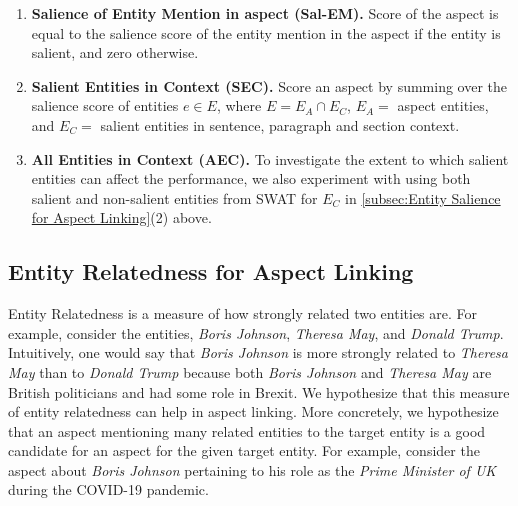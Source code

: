\begin{enumerate}
    \item \textbf{Salience of Entity Mention in aspect (Sal-EM).} Score of the aspect is equal to the salience score of the entity mention in the aspect if the entity is salient, and zero otherwise.
    
    \item \textbf{Salient Entities in Context (SEC).} Score an aspect by summing over the salience score of entities $e \in E$, where $E = E_A \cap E_C$, $E_A =$ aspect entities, and $E_C =$ salient entities in sentence, paragraph and section context.
    
    \item \textbf{All Entities in Context (AEC).} 
    To investigate the extent to which salient entities can affect the performance, we also experiment with using both salient and non-salient entities from SWAT for $E_C$ in \ref{subsec:Entity Salience for Aspect Linking}(2) above. 
\end{enumerate}


\subsection{Entity Relatedness for Aspect Linking}
\label{subsec:Entity Relatedness for Aspect Linking}



Entity Relatedness is a measure of how strongly related two entities are. For example, consider the entities, \textit{Boris Johnson}, \textit{Theresa May}, and \textit{Donald Trump}. Intuitively, one would say that \textit{Boris Johnson} is more strongly related to \textit{Theresa May} than to \textit{Donald Trump} because both \textit{Boris Johnson} and \textit{Theresa May} are British politicians and had some role in Brexit. We hypothesize that this measure of entity relatedness can help in aspect linking. More concretely, we hypothesize that an aspect mentioning many related entities to the target entity  is a good candidate for an aspect for the given target entity. For example, consider the aspect about \textit{Boris Johnson} pertaining to his role as the \textit{Prime Minister of UK} during the COVID-19 pandemic.

